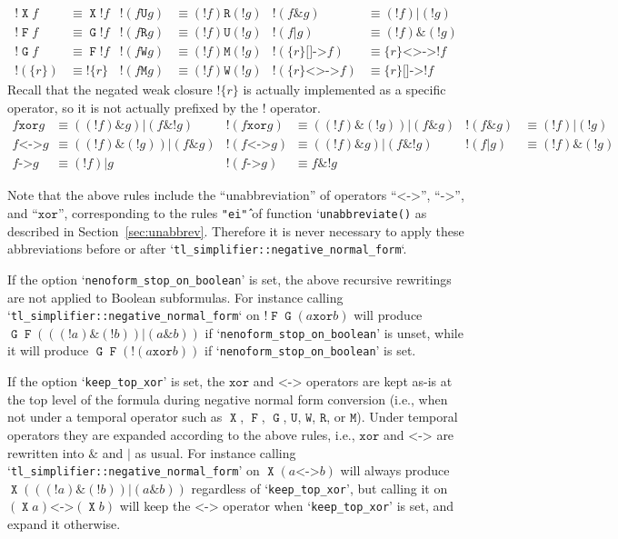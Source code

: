 \documentclass[a4paper,twoside,10pt,DIV=12]{scrreprt}
\DeclareMathOperator{\F}{\texttt{F}}
\DeclareMathOperator{\G}{\texttt{G}}
\newcommand{\U}{\mathbin{\texttt{U}}}
\newcommand{\R}{\mathbin{\texttt{R}}}
\DeclareMathOperator{\X}{\texttt{X}}
\newcommand{\M}{\mathbin{\texttt{M}}}
\newcommand{\W}{\mathbin{\texttt{W}}}
\DeclareMathOperator{\NOT}{\texttt{!}}
\newcommand{\XOR}{\mathbin{\texttt{xor}}}
\newcommand{\IMPLIES}{\mathbin{\texttt{->}}}
\newcommand{\EQUIV}{\mathbin{\texttt{<->}}}
\newcommand{\OR}{\mathbin{\texttt{|}}}
\newcommand{\AND}{\mathbin{\texttt{\&}}}
\newcommand{\0}{\texttt{0}}
\newcommand{\1}{\texttt{1}}
\newcommand{\Esuffix}{\texttt{<>->}}
\newcommand{\Asuffix}{\texttt{[]->}}
\newcommand{\sere}[1]{\texttt{\{}#1\texttt{\}}}
\newcommand{\nsere}[1]{\texttt{!\{}#1\texttt{\}}}
\begin{document}
\begin{align*}
  \NOT\X f & \equiv \X\NOT f &
  \NOT(f \U g) & \equiv (\NOT f) \R (\NOT g) &
  \NOT(f \AND g)&\equiv (\NOT f) \OR (\NOT g)
  \\
  \NOT\F f & \equiv \G\NOT f &
  \NOT(f \R g) & \equiv (\NOT f) \U (\NOT g) &
  \NOT(f \OR g)&\equiv (\NOT f)\AND (\NOT g)
  \\
  \NOT\G f & \equiv \F\NOT f &
  \NOT(f \W g) & \equiv (\NOT f) \M (\NOT g) &
  \NOT(\sere{r} \Asuffix f) &\equiv \sere{r} \Esuffix \NOT f
  \\
  \NOT(\sere{r})&\equiv \nsere{r}&
  \NOT(f \M g) & \equiv (\NOT f) \W (\NOT g)&
  \NOT(\sere{r} \Esuffix f) &\equiv \sere{r} \Asuffix \NOT f
\end{align*}
\noindent Recall that the negated weak closure $\nsere{r}$ is actually
implemented as a specific operator, so it is not actually prefixed by the
$\NOT$ operator.
\begin{align*}
  f \XOR g & \equiv ((\NOT f)\AND g)\OR(f\AND\NOT g) &
  \NOT(f \XOR g) & \equiv ((\NOT f)\AND(\NOT g))\OR(f\AND g) &
  \NOT(f \AND g) & \equiv (\NOT f)\OR(\NOT g) \\
  f \EQUIV g & \equiv ((\NOT f)\AND(\NOT g))\OR(f\AND g) &
  \NOT(f \EQUIV g) & \equiv ((\NOT f)\AND g)\OR(f\AND\NOT g) &
  \NOT(f \OR g) & \equiv (\NOT f)\AND(\NOT g) \\
  f \IMPLIES g & \equiv (\NOT f) \OR g &
  \NOT(f \IMPLIES g) & \equiv f \AND \NOT g
\end{align*}

Note that the above rules include the ``unabbreviation'' of operators
``$\EQUIV$'', ``$\IMPLIES$'', and ``$\XOR$'', corresponding to the
rules \texttt{"ei\^"} of function `\verb=unabbreviate()= as described
in Section~\ref{sec:unabbrev}.  Therefore it is never necessary to
apply these abbreviations before or after
`\verb|tl_simplifier::negative_normal_form|`.

If the option `\verb|nenoform_stop_on_boolean|' is set, the above
recursive rewritings are not applied to Boolean subformulas.  For
instance calling `\verb|tl_simplifier::negative_normal_form|` on
$\NOT\F\G(a \XOR b)$ will produce $\G\F(((\NOT a)\AND(\NOT
b))\OR(a\AND b))$ if `\verb|nenoform_stop_on_boolean|' is unset, while
it will produce $\G\F(\NOT(a \XOR b))$ if
`\verb|nenoform_stop_on_boolean|' is set.

If the option `\verb|keep_top_xor|' is set, the $\XOR$ and $\EQUIV$
operators are kept as-is at the top level of the formula during
negative normal form conversion (i.e., when not under a temporal
operator such as $\X$, $\F$, $\G$, $\U$, $\W$, $\R$, or $\M$).  Under
temporal operators they are expanded according to the above rules,
i.e., $\XOR$ and $\EQUIV$ are rewritten into $\AND$ and $\OR$ as
usual.  For instance calling
`\verb|tl_simplifier::negative_normal_form|' on
$\X(a \EQUIV b)$ will always produce $\X(((\NOT a)\AND(\NOT b))\OR(a\AND
b))$ regardless of `\verb|keep_top_xor|', but calling it on
$(\X a) \EQUIV (\X b)$ will keep the $\EQUIV$ operator when
`\verb|keep_top_xor|' is set, and expand it otherwise.
\end{document}

